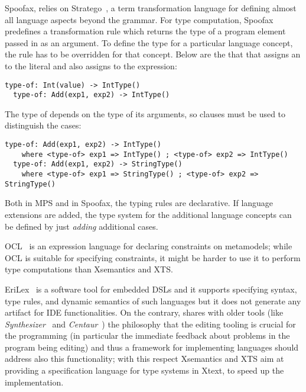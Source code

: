 
Spoofax, relies on Stratego~\cite{Stratego2008}, a term transformation language
for defining almost all language aspects beyond the grammar. For type computation,
Spoofax predefines a transformation rule  which returns the type of
a program element passed in as an argument. To define the type for a
particular language concept, the  rule has to be overridden for that
concept. Below are the that that assigns an  to the
 literal and also assigns  to the  expression:

\begin{lstlisting}[language=Spoofax]
  type-of: Int(value) -> IntType()
  type-of: Add(exp1, exp2) -> IntType()
\end{lstlisting}

The type of  depends on the type of its arguments, so  clauses
must be used to distinguish the cases:

\begin{lstlisting}[language=Spoofax]
  type-of: Add(exp1, exp2) -> IntType()
    where <type-of> exp1 => IntType() ; <type-of> exp2 => IntType()
  type-of: Add(exp1, exp2) -> StringType()
    where <type-of> exp1 => StringType() ; <type-of> exp2 => StringType()
\end{lstlisting}

Both in MPS and in Spoofax, the typing rules are declarative. If language
extensions are added, the type system for the additional language concepts can be defined by
just \emph{adding} additional cases.










OCL~\cite{WarmerKleppe99,OCLOMG} is an expression language for declaring
constraints on metamodels; while OCL is suitable for specifying constraints, it
might be harder to use it to perform type computations than Xsemantics and XTS.

EriLex~\cite{EriLex} is a software tool for embedded DSLs and it supports
specifying syntax, type rules, and dynamic semantics of such languages but it
does not generate any artifact for IDE functionalities.
On the contrary, \xtext{} shares with older tools (like
\emph{Synthesizer}~\cite{Synthesizer} and \emph{Centaur}~\cite{Centaur}) the
philosophy that the editing tooling is crucial for the programming (in
particular the immediate feedback about problems in the program being editing)
and thus a framework for implementing languages should address also this
functionality; with this respect Xsemantics and XTS aim at providing a
specification language for type systems in Xtext, to speed up the
implementation.

